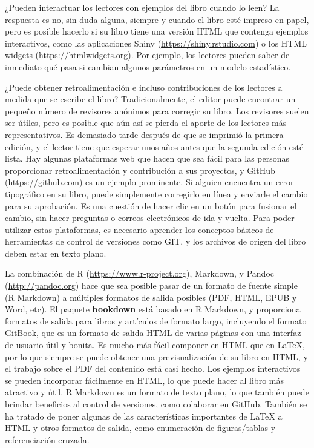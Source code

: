 \documentclass[12pt,]{krantz}
\theoremstyle{definition}
\theoremstyle{definition}
\theoremstyle{remark}
\begin{document}
¿Pueden interactuar los lectores con ejemplos del libro cuando lo leen?
La respuesta es no, sin duda alguna, siempre y cuando el libro esté
impreso en papel, pero es posible hacerlo si su libro tiene una versión
HTML que contenga ejemplos interactivos, como las aplicaciones Shiny
(\url{https://shiny.rstudio.com}) o los HTML widgets
(\url{https://htmlwidgets.org}). Por ejemplo, los lectores pueden saber
de inmediato qué pasa si cambian algunos parámetros en un modelo
estadístico.

¿Puede obtener retroalimentación e incluso contribuciones de los
lectores a medida que se escribe el libro? Tradicionalmente, el editor
puede encontrar un pequeño número de revisores anónimos para corregir su
libro. Los revisores suelen ser útiles, pero es posible que aún así se
pierda el aporte de los lectores más representativos. Es demasiado tarde
después de que se imprimió la primera edición, y el lector tiene que
esperar unos años antes que la segunda edición esté lista. Hay algunas
plataformas web que hacen que sea fácil para las personas proporcionar
retroalimentación y contribución a sus proyectos, y GitHub
(\url{https://github.com}) es un ejemplo prominente. Si alguien
encuentra un error tipográfico en su libro, puede simplemente corregirlo
en línea y enviarle el cambio para su aprobación. Es una cuestión de
hacer clic en un botón para fusionar el cambio, sin hacer preguntas o
correos electrónicos de ida y vuelta. Para poder utilizar estas
plataformas, es necesario aprender los conceptos básicos de herramientas
de control de versiones como GIT, y los archivos de origen del libro
deben estar en texto plano.

La combinación de R (\url{https://www.r-project.org}), Markdown, y
Pandoc (\url{http://pandoc.org}) hace que sea posible pasar de un
formato de fuente simple (R Markdown) a múltiples formatos de salida
posibles (PDF, HTML, EPUB y Word, etc). El paquete \textbf{bookdown}
está basado en R Markdown, y proporciona formatos de salida para libros
y artículos de formato largo, incluyendo el formato GitBook, que es un
formato de salida HTML de varias páginas con una interfaz de usuario
útil y bonita. Es mucho más fácil componer en HTML que en LaTeX, por lo
que siempre se puede obtener una previsualización de su libro en HTML, y
el trabajo sobre el PDF del contenido está casi hecho. Los ejemplos
interactivos se pueden incorporar fácilmente en HTML, lo que puede hacer
al libro más atractivo y útil. R Markdown es un formato de texto plano,
lo que también puede brindar beneficios al control de versiones, como
colaborar en GitHub. También se ha tratado de poner algunas de las
características importantes de LaTeX a HTML y otros formatos de salida,
como enumeración de figuras/tablas y referenciación cruzada.
\end{document}
